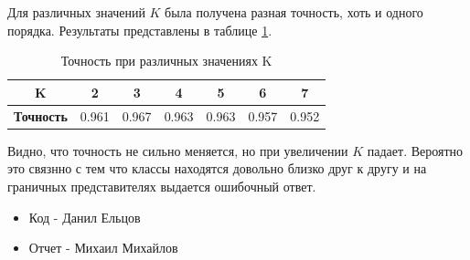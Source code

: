 \documentclass{article}
\begin{document}
Для различных значений \(K\) была получена разная точность, хоть и одного порядка. Результаты представлены в таблице \ref{tab1}.

\begin{table}[h!]
    \begin{tabular}{|c|c|c|c|c|c|c|}
    \hline
    \textbf{K}        & 2 & 3 & 4 & 5  & 6 & 7 \\ \hline
    \textbf{Точность} & 0.961 & 0.967  & 0.963  & 0.963  & 0.957  & 0.952  \\ \hline
    \end{tabular}
    \caption{Точность при различных значениях K}
    \label{tab1}
\end{table}

Видно, что точность не сильно меняется, но при увеличении \(K\) падает. Вероятно это связнно с тем что классы находятся довольно близко друг к другу и на граничных представителях выдается ошибочный ответ.

\begin{itemize}
    \item Код - Данил Ельцов
    \item Отчет - Михаил Михайлов
\end{itemize}
\end{document}
